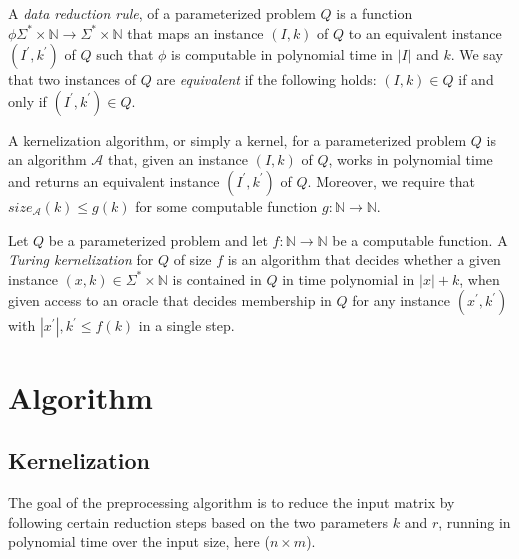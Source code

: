 \documentclass[a4paper]{article}
\begin{document}
\begin{theoremdefinition}{\cite[p.~18]{param_algo_book}}
    A \textit{data reduction rule}, of a parameterized problem $Q$ is a function
    $\phi \Sigma^* \times \mathbb{N} \rightarrow \Sigma^* \times \mathbb{N}$ 
    that maps an instance $(I,k)$ of $Q$ to an equivalent
    instance $(I^\prime, k^\prime)$ of $Q$ such that $\phi$ is computable in polynomial time
    in $|I|$ and $k$. We say that two instances of $Q$ are \textit{equivalent} if the following
    holds: $(I,k) \in Q$ if and only if $(I^\prime, k^\prime) \in Q$.
\end{theoremdefinition}

\begin{theoremdefinition}{\cite[p.~18]{param_algo_book} \label{def:kernelization}}
    A kernelization algorithm, or simply a kernel, for a parameterized problem $Q$
    is an algorithm $\mathcal{A}$ that, given an instance $(I,k)$ of $Q$, works in polynomial
    time and returns an equivalent instance $(I^\prime, k^\prime)$ of $Q$. Moreover, we require
    that $size_{\mathcal{A}}(k) \leq g(k)$ for some computable function
    $g: \mathbb{N} \rightarrow \mathbb{N}$.
\end{theoremdefinition}

\begin{theoremdefinition}{\cite[p.~314]{param_algo_book} \label{def:turing-kernelization}}
    Let $Q$ be a parameterized problem and let $f:\mathbb{N} \rightarrow \mathbb{N} $
    be a computable function. A \textit{Turing kernelization} for $Q$ of size $f$ is an
    algorithm that decides whether a given instance $(x,k) \in \Sigma^* \times \mathbb{N}$
    is contained in $Q$ in time polynomial in $|x|+k$, when given access to an oracle
    that decides membership in $Q$ for any instance $(x^\prime, k^\prime)$ with
    $|x^\prime|,k^\prime \leq f(k)$ in a single step.
\end{theoremdefinition}

%
%

\newpage

\section{Algorithm}
\label{sec:algo}
\subsection{Kernelization}
\label{sec:algo:kernel}
The goal of the preprocessing algorithm is to reduce the input matrix by following certain reduction steps
based on the two parameters $k$ and $r$, running in polynomial time over the input size, here ($n \times m$).
\end{document}
